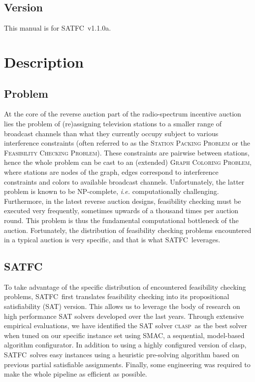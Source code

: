 \documentclass[
10pt, %
letterpaper, %
oneside, %
headinclude,footinclude, %
BCOR5mm, %
needspace, %
]{scrartcl}
\newcommand{\SATFC}{\textsc{SATFC}~}
\newcommand{\clasp}{\textsc{clasp}~}
\begin{document}
\subsection{Version}
This manual is for \SATFC v1.1.0a.

\section{Description}

\subsection{Problem}
At the core of the reverse auction part of the radio-spectrum incentive auction lies the problem of (re)assigning television stations to a smaller range of broadcast channels than what they currently occupy subject to various interference constraints (often referred to as the \textsc{Station Packing Problem} or the \textsc{Feasibility Checking Problem}). These constraints are pairwise between stations, hence the whole problem can be cast to an (extended) \textsc{Graph Coloring Problem}, where stations are nodes of the graph, edges correspond to interference constraints and colors to available broadcast channels. Unfortunately, the latter problem is known to be {NP}-complete, \emph{i.e.} computationally challenging. Furthermore, in the latest reverse auction designs, feasibility checking must be executed very frequently, sometimes upwards of a thousand times per auction round. This problem is thus the fundamental computational bottleneck of the auction. Fortunately, the distribution of feasibility checking problems encountered in a typical auction is very specific, and that is what \SATFC leverages.

\subsection{\SATFC}
To take advantage of the specific distribution of encountered feasibility checking problems, \SATFC first translates feasibility checking into its propositional satisfiability (SAT) version. This allows us to leverage the body of research on high performance SAT solvers developed over the last years. Through extensive empirical evaluations, we have identified the SAT solver \clasp as the best solver when tuned on our specific instance set using SMAC, a sequential, model-based algorithm configurator. In addition to using a highly configured version of clasp, \SATFC solves easy instances using a heuristic pre-solving algorithm based on previous partial satisfiable assignments. Finally, some engineering was required to make the whole pipeline as efficient as possible.
\end{document}
